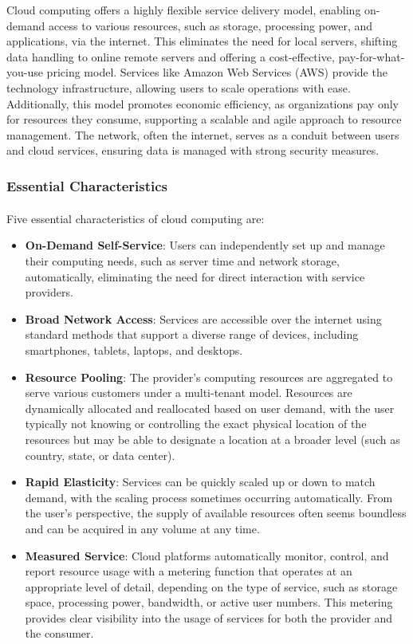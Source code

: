 Cloud computing offers a highly flexible service delivery model, enabling on-demand access to
various resources, such as storage, processing power, and applications, via the internet. This
eliminates the need for local servers, shifting data handling to online remote servers and offering
a cost-effective, pay-for-what-you-use pricing model. Services like Amazon Web Services (AWS)
provide the technology infrastructure, allowing users to scale operations with ease. Additionally,
this model promotes economic efficiency, as organizations pay only for resources they consume,
supporting a scalable and agile approach to resource management. The network, often the internet,
serves as a conduit between users and cloud services, ensuring data is managed with strong security
measures.

\subsubsection{Essential Characteristics}
Five essential characteristics of cloud computing are\textsuperscript{\cite{nist}}:
\begin{itemize}
    \item \textbf{On-Demand Self-Service}: Users can independently set up and manage their computing needs, such as
          server time and network storage, automatically, eliminating the need for direct interaction with
          service providers.
    \item \textbf{Broad Network Access}: Services are accessible over the internet using standard methods that
          support a diverse range of devices, including smartphones, tablets, laptops, and desktops.
    \item \textbf{Resource Pooling}: The provider's computing resources are aggregated to serve various customers
          under a multi-tenant model. Resources are dynamically allocated and reallocated based on user
          demand, with the user typically not knowing or controlling the exact physical location of the
          resources but may be able to designate a location at a broader level (such as country, state, or
          data center).
    \item \textbf{Rapid Elasticity}: Services can be quickly scaled up or down to match demand, with the scaling
          process sometimes occurring automatically. From the user's perspective, the supply of available
          resources often seems boundless and can be acquired in any volume at any time.
    \item \textbf{Measured Service}: Cloud platforms automatically monitor, control, and report resource usage with
          a metering function that operates at an appropriate level of detail, depending on the type of
          service, such as storage space, processing power, bandwidth, or active user numbers. This metering
          provides clear visibility into the usage of services for both the provider and the consumer.
\end{itemize}

